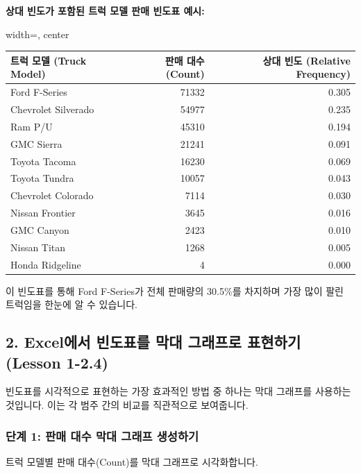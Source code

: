 \documentclass[11pt,a4paper]{article}
\theoremstyle{definition}
\begin{document}
\begin{examplebox}
\textbf{상대 빈도가 포함된 트럭 모델 판매 빈도표 예시:}
\begin{adjustbox}{width=\textwidth, center}
\begin{tabular}{lrr}
\toprule
\textbf{트럭 모델 (Truck Model)} & \textbf{판매 대수 (Count)} & \textbf{상대 빈도 (Relative Frequency)} \\
\midrule
Ford F-Series & 71332 & 0.305 \\
Chevrolet Silverado & 54977 & 0.235 \\
Ram P/U & 45310 & 0.194 \\
GMC Sierra & 21241 & 0.091 \\
Toyota Tacoma & 16230 & 0.069 \\
Toyota Tundra & 10057 & 0.043 \\
Chevrolet Colorado & 7114 & 0.030 \\
Nissan Frontier & 3645 & 0.016 \\
GMC Canyon & 2423 & 0.010 \\
Nissan Titan & 1268 & 0.005 \\
Honda Ridgeline & 4 & 0.000 \\
\bottomrule
\end{tabular}
\end{adjustbox}
\end{examplebox}
이 빈도표를 통해 Ford F-Series가 전체 판매량의 30.5\%를 차지하며 가장 많이 팔린 트럭임을 한눈에 알 수 있습니다.

\newpage
\subsection{2. Excel에서 빈도표를 막대 그래프로 표현하기 (Lesson 1-2.4)}

빈도표를 시각적으로 표현하는 가장 효과적인 방법 중 하나는 막대 그래프를 사용하는 것입니다. 이는 각 범주 간의 비교를 직관적으로 보여줍니다.

\subsubsection*{단계 1: 판매 대수 막대 그래프 생성하기}
트럭 모델별 판매 대수(Count)를 막대 그래프로 시각화합니다.
\end{document}
